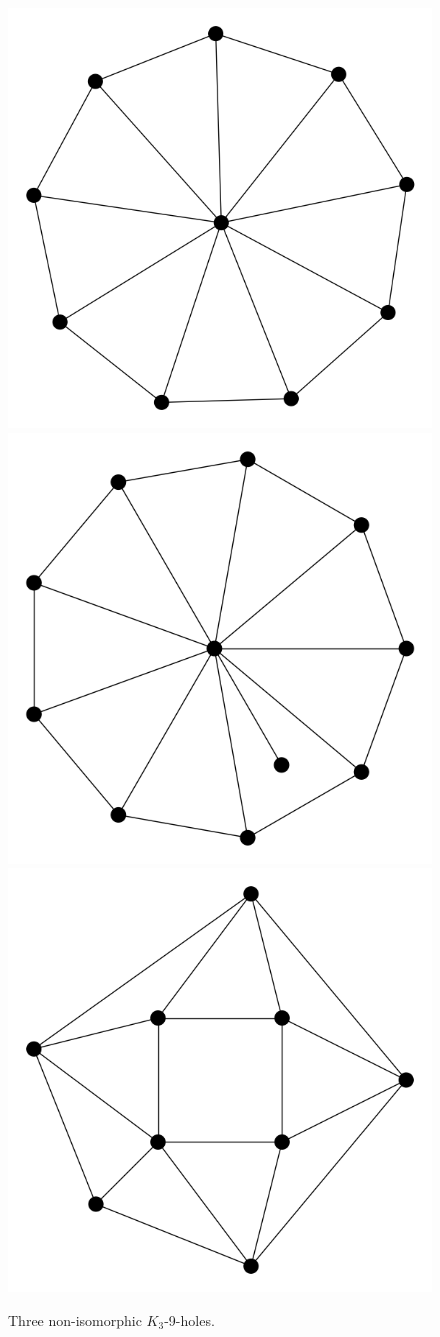\begin{figure}[htd]
	\centering
	\includegraphics[width=.3\textwidth,natwidth=589,natheight=584]{9holeA.png}
	\includegraphics[width=.3\textwidth,natwidth=575,natheight=584]{9holeB.png}
	\includegraphics[width=.3\textwidth,natwidth=584,natheight=584]{9holeC.png}
	\caption{Three non-isomorphic $K_3$-9-holes.}
	\label{9holeintro}
\end{figure}

